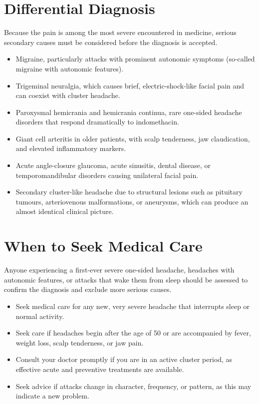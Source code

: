 \section*{Differential Diagnosis}
Because the pain is among the most severe encountered in medicine, serious secondary causes must be considered before the diagnosis is accepted.
\begin{itemize}
    \item Migraine, particularly attacks with prominent autonomic symptoms (so-called migraine with autonomic features).
    \item Trigeminal neuralgia, which causes brief, electric-shock-like facial pain and can coexist with cluster headache.
    \item Paroxysmal hemicrania and hemicrania continua, rare one-sided headache disorders that respond dramatically to indomethacin.
    \item Giant cell arteritis in older patients, with scalp tenderness, jaw claudication, and elevated inflammatory markers.
    \item Acute angle-closure glaucoma, acute sinusitis, dental disease, or temporomandibular disorders causing unilateral facial pain.
    \item Secondary cluster-like headache due to structural lesions such as pituitary tumours, arteriovenous malformations, or aneurysms, which can produce an almost identical clinical picture.
\end{itemize}

\section*{When to Seek Medical Care}
Anyone experiencing a first-ever severe one-sided headache, headaches with autonomic features, or attacks that wake them from sleep should be assessed to confirm the diagnosis and exclude more serious causes.
\begin{itemize}
    \item Seek medical care for any new, very severe headache that interrupts sleep or normal activity.
    \item Seek care if headaches begin after the age of 50 or are accompanied by fever, weight loss, scalp tenderness, or jaw pain.
    \item Consult your doctor promptly if you are in an active cluster period, as effective acute and preventive treatments are available.
    \item Seek advice if attacks change in character, frequency, or pattern, as this may indicate a new problem.
\end{itemize}

